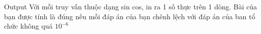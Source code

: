 Output  
Với mỗi truy vấn thuộc dạng sin cos, in ra 1 số thực trên 1 dòng. Bài của bạn được tính là đúng nếu mỗi đáp án của bạn chênh lệch với đáp án của ban tổ chức không quá $10^{-6}$